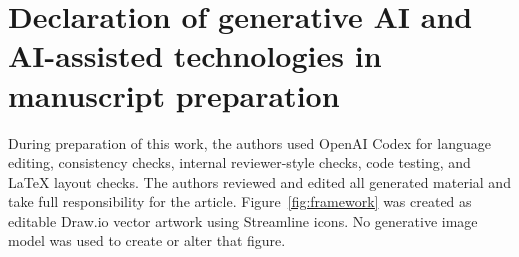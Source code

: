 \documentclass[11pt,a4paper]{article}
\begin{document}
\section*{Declaration of generative AI and AI-assisted technologies in manuscript preparation}

During preparation of this work, the authors used OpenAI Codex for language editing, consistency checks, internal reviewer-style checks, code testing, and LaTeX layout checks. The authors reviewed and edited all generated material and take full responsibility for the article. Figure~\ref{fig:framework} was created as editable Draw.io vector artwork using Streamline icons. No generative image model was used to create or alter that figure.



\end{document}
